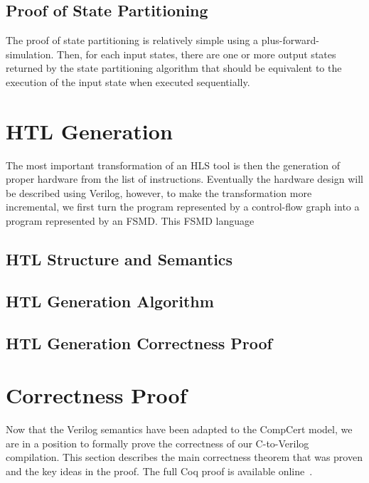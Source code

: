 \subsection{Proof of State Partitioning}

The proof of state partitioning is relatively simple using a
\gls{plus-forward-simulation}.  Then, for each input states, there are one or
more output states returned by the state partitioning algorithm that should be
equivalent to the execution of the input state when executed sequentially.

\section{HTL Generation}%
\label{sec:hg:htl-generation}

The most important transformation of an HLS tool is then the generation of
proper hardware from the list of instructions.  Eventually the hardware design
will be described using Verilog, however, to make the transformation more
incremental, we first turn the program represented by a control-flow graph into
a program represented by an \gls{FSMD}.  This \gls{FSMD} language

\subsection{HTL Structure and Semantics}%
\label{sec:hg:htl-structure-and-semantics}

\subsection{HTL Generation Algorithm}%
\label{sec:hg:htl-generation}

\subsection{HTL Generation Correctness Proof}%
\label{sec:hg:htl-generation-correctness-proof}

\section{Correctness Proof}\label{sec:proof}


Now that the Verilog semantics have been adapted to the CompCert model, we are
in a position to formally prove the correctness of our C-to-Verilog compilation.
This section describes the main correctness theorem that was proven and the key
ideas in the proof. The full Coq proof is available
online~\cite{yann_herklotz_2021_5093839}.

